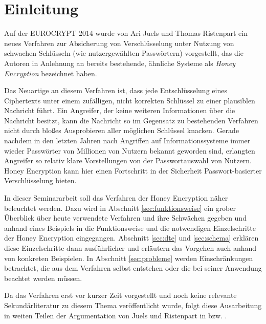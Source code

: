 \section{Einleitung}

Auf der EUROCRYPT 2014 wurde von Ari Juels und Thomas Ristenpart ein neues Verfahren zur Absicherung von Verschlüsselung unter Nutzung von schwachen Schlüsseln (wie nutzergewählten Passwörtern) vorgestellt, das die Autoren in Anlehnung an bereits bestehende, ähnliche Systeme als \emph{Honey Encryption} bezeichnet haben. 

Das Neuartige an diesem Verfahren ist, dass jede Entschlüsselung eines Ciphertexts unter einem zufälligen, nicht korrekten Schlüssel zu einer plausiblen Nachricht führt. Ein Angreifer, der keine weiteren Informationen über die Nachricht besitzt, kann die Nachricht so im Gegensatz zu bestehenden Verfahren nicht durch bloßes Ausprobieren aller möglichen Schlüssel knacken. Gerade nachdem in den letzten Jahren nach Angriffen auf Informationssysteme immer wieder Passwörter von Millionen von Nutzern bekannt geworden sind, erlangten  Angreifer so relativ klare Vorstellungen von der Passwortauswahl von Nutzern. Honey Encryption kann hier einen Fortschritt in der Sicherheit Passwort-basierter Verschlüsselung bieten.

In dieser Seminararbeit soll das Verfahren der Honey Encryption näher beleuchtet werden. Dazu wird in Abschnitt \ref{sec:funktionsweise} ein grober Überblick über heute verwendete Verfahren und ihre Schwächen gegeben und anhand eines Beispiels in die Funktionsweise und die notwendigen Einzelschritte der Honey Encryption eingegangen. Abschnitt \ref{sec:dte} und \ref{sec:schema} erklären diese Einzelschritte dann ausführlicher und erläutern das Vorgehen auch anhand von konkreten Beispielen. In Abschnitt \ref{sec:probleme} werden Einschränkungen betrachtet, die aus dem Verfahren selbst entstehen oder die bei seiner Anwendung beachtet werden müssen.

Da das Verfahren erst vor kurzer Zeit vorgestellt und noch keine relevante Sekundärliteratur zu diesem Thema veröffentlicht wurde, folgt diese Ausarbeitung in weiten Teilen der Argumentation von Juels und Ristenpart in \cite{IEEE2014} bzw. \cite{EURO2014}.
\newpage